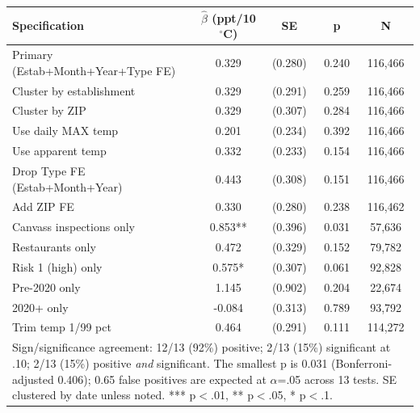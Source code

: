 \begin{tabular}{lcccc}
\hline\hline
Specification & $\hat\beta$ (ppt/10$^\circ$C) & SE & p & N \\
\hline
Primary (Estab+Month+Year+Type FE) & 0.329 & (0.280) & 0.240 & 116,466 \\
Cluster by establishment & 0.329 & (0.291) & 0.259 & 116,466 \\
Cluster by ZIP & 0.329 & (0.307) & 0.284 & 116,466 \\
Use daily MAX temp & 0.201 & (0.234) & 0.392 & 116,466 \\
Use apparent temp & 0.332 & (0.233) & 0.154 & 116,466 \\
Drop Type FE (Estab+Month+Year) & 0.443 & (0.308) & 0.151 & 116,466 \\
Add ZIP FE & 0.330 & (0.280) & 0.238 & 116,462 \\
Canvass inspections only & 0.853** & (0.396) & 0.031 & 57,636 \\
Restaurants only & 0.472 & (0.329) & 0.152 & 79,782 \\
Risk 1 (high) only & 0.575* & (0.307) & 0.061 & 92,828 \\
Pre-2020 only & 1.145 & (0.902) & 0.204 & 22,674 \\
2020+ only & -0.084 & (0.313) & 0.789 & 93,792 \\
Trim temp 1/99 pct & 0.464 & (0.291) & 0.111 & 114,272 \\
\hline
\multicolumn{5}{p{0.92\linewidth}}{\footnotesize Sign/significance agreement: 12/13 (92\%) positive; 2/13 (15\%) significant at .10; 2/13 (15\%) positive \emph{and} significant. The smallest p is 0.031 (Bonferroni-adjusted 0.406); 0.65 false positives are expected at $\alpha$=.05 across 13 tests. SE clustered by date unless noted. *** p$<$.01, ** p$<$.05, * p$<$.1.}\\
\end{tabular}